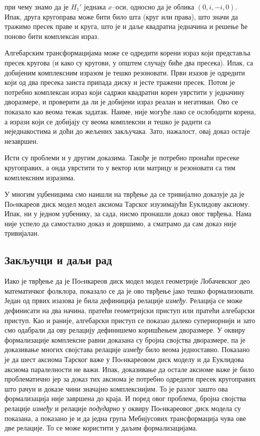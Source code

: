 \noindent при чему знамо да је $H_1'$ једнака $x$--оси, односно да је
облика $(0, i, -i, 0)$. Ипак, друга кругоправа може бити било шта
(круг или права), што значи да тражимо пресек праве и круга, што је и
даље квадратна једначина и решење ће поново бити комплексан израз.

Алгебарским трансформацијама може се одредити корени израз који
представља пресек кругова (и како су кругови, у општем случају биће
два пресека). Ипак, са добијеним комплексним изразом је тешко
резоновати. Први изазов је одредити који од два пресека заиста припада
диску и јесте тражени пресек. Потом је потребно комплексан израз који
садржи квадратни корен уврстити у једначину дворазмере, и проверити да
ли је добијени израз реалан и негативан. Ово се показало као веома
тежак задатак. Наиме, није могуће лако се ослободити корена, а изрази
који се добијају су веома комплексни и тешко је радити са
неједнакостима и доћи до жељених закључака. Зато, нажалост, овај доказ
остаје незавршен.

Исти су проблеми и у другим доказима. Такође је потребно пронаћи
пресеке кругоправих, а онда уврстити то у вектор или матрицу и
резоновати са тим комплексним изразима.

У многим уџбеницима \cite{needham, schwerdtfeger} смо наишли на
тврђење да се тривијално доказује да је Поeнкареов диск модел модел
аксиома Тарског изузимајући Еуклидову аксиому. Ипак, ни у једном
уџбенику, за сада, нисмо пронашли доказ овог тврђења. Нама није успело
да самостално доказ и довршимо, а сматрамо да сам доказ није
тривијалан.

\subsection{Закључци и даљи рад}

Иако је тврђење да је Поeнкареов диск модел модел геометрије
Лобачевског део математичког фолклора, показало се да је ово тврђење
јако тешко формализовати. Један од првих изазова је била дефиниција
релације \emph{између}. Релација се може дефинисати на два начина,
пратећи геометријски приступ или пратећи алгебарски приступ. Као и
раније, алгебарски приступ се показао далеко супериорнији и зато смо
одабрали да ову релацију дефинишемо коришћењем дворазмере. У оквиру
формализације комплексне равни доказана су бројна својства дворазмере,
па је доказивање многих својстава релације \emph{између} било веома
једноставно. Показано је да шест аксиома Тарског важе у Поeнкареовом
диск моделу и да Еуклидова аксиома паралелности не важи. Ипак,
доказивање да остале аксиоме важе је било проблематично јер за доказ
тих аксиома је потребно одредити пресек кругоправих што рачун и доказе
чини значајно комплекснијим. То је разлог зашто ова формализација није
завршена до краја. И поред овог проблема, бројна својства релације
\emph{између} и релације \emph{подударно} у оквиру Поeнкареовог диск
модела су показана, а показано је и да једна група Мебијусових
трансформација чува ове две релације. То се може користити у даљим
формализацијама.

